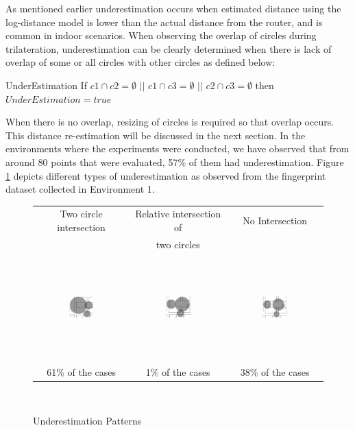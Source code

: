 \documentclass[twocolumn]{svjour3}
\begin{document}
As mentioned earlier underestimation occurs when estimated distance using the log-distance model is lower than the actual distance from the router, and is common in indoor scenarios. When observing the overlap of circles during trilateration, underestimation can be clearly determined when there is lack of overlap of some or all circles with other circles as defined below:
\begin{definition}{UnderEstimation}
If $c1 \cap c2 = \emptyset$  $||$  $c1 \cap c3 = \emptyset$  $||$  $c2 \cap c3 = \emptyset$ then $UnderEstimation = true$  
\label{def:under}
\end{definition}
When there is no overlap, resizing of circles is required so that overlap occurs. This distance re-estimation will be discussed in the next section. 
In the environments where the experiments were conducted, we have observed that from around 80 points that were evaluated, 57\% of them had underestimation. Figure \ref{types_underest} depicts different types of underestimation as observed from the fingerprint dataset collected in Environment 1. 
\begin{figure}[t]
\centering
\begin{tabular}{ |c|c|c| }
\hline
Two circle intersection & Relative intersection of & No Intersection \\
& two circles & \\        
\hline
\includegraphics[width=0.28\textwidth, height=40mm]{Two-Intersect.jpg}
& 
\includegraphics[width=0.28\textwidth, height=40mm]{In-Between.jpg}
& 
\includegraphics[width=0.28\textwidth, height=40mm]{Non-Intersect.jpg}
\\  \hline
61\% of the cases & 1\% of the cases & 38\% of the cases
\\ \hline 
\end{tabular}
\\
\hfill \break
\caption{Underestimation Patterns}
\label{types_underest}
\end{figure}
\end{document}
